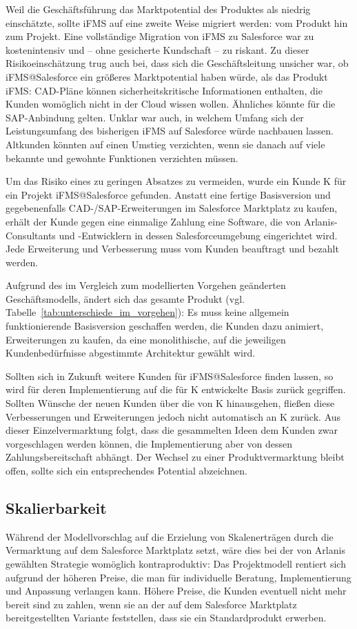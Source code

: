 Weil die Geschäftsführung das Marktpotential des Produktes als niedrig einschätzte, sollte
iFMS auf eine zweite Weise migriert werden: vom Produkt 
hin zum Projekt. Eine vollständige Migration von iFMS zu Salesforce war zu 
kostenintensiv und -- ohne gesicherte Kundschaft -- zu riskant. Zu dieser 
Risikoeinschätzung trug auch bei, dass sich die Geschäftsleitung unsicher war, 
ob iFMS@Salesforce ein größeres Marktpotential haben würde, als das Produkt iFMS: 
CAD-Pläne können sicherheitskritische 
Informationen enthalten, die Kunden womöglich nicht in der Cloud wissen wollen. 
Ähnliches könnte für die SAP-Anbindung gelten. Unklar war auch, in 
welchem Umfang sich der Leistungsumfang des bisherigen iFMS auf Salesforce 
würde nachbauen lassen. Altkunden könnten auf einen Umstieg verzichten, wenn 
sie danach auf viele bekannte und gewohnte Funktionen verzichten müssen. 

Um das Risiko eines zu geringen Absatzes zu vermeiden, wurde ein Kunde K für 
ein Projekt iFMS@Salesforce gefunden. Anstatt eine fertige Basisversion und 
gegebenenfalls CAD-/SAP-Erweiterungen im Salesforce Marktplatz zu kaufen, 
erhält der Kunde gegen eine einmalige Zahlung eine Software, die von 
Arlanis-Consultants und -Entwicklern in dessen Salesforceumgebung eingerichtet 
wird. 
Jede Erweiterung und Verbesserung muss vom Kunden beauftragt und bezahlt werden.



Aufgrund des im Vergleich zum modellierten Vorgehen geänderten 
Geschäftsmodells, ändert sich das gesamte Produkt (vgl. 
Tabelle~\ref{tab:unterschiede_im_vorgehen}): Es muss keine allgemein 
funktionierende Basisversion geschaffen werden, die Kunden dazu animiert, 
Erweiterungen zu kaufen, da eine monolithische, auf die jeweiligen 
Kundenbedürfnisse abgestimmte Architektur gewählt wird.

Sollten sich in Zukunft weitere Kunden für iFMS@Salesforce finden lassen, so 
wird für deren Implementierung auf die für K entwickelte Basis zurück 
gegriffen. Sollten Wünsche der neuen Kunden über die von K hinausgehen, fließen 
diese Verbesserungen und Erweiterungen jedoch nicht automatisch an K zurück. 
Aus dieser Einzelvermarktung folgt, dass die gesammelten Ideen dem Kunden zwar 
vorgeschlagen werden können, die Implementierung aber von dessen 
Zahlungsbereitschaft abhängt. Der Wechsel zu einer Produktvermarktung bleibt offen, sollte
sich ein entsprechendes Potential abzeichnen.

\subsection{Skalierbarkeit}
Während der Modellvorschlag auf die Erzielung von Skalenerträgen durch die 
Vermarktung auf dem Salesforce Marktplatz setzt, wäre dies bei der von Arlanis 
gewählten Strategie womöglich kontraproduktiv: Das Projektmodell rentiert sich 
aufgrund der höheren Preise, die man für individuelle Beratung, Implementierung 
und Anpassung verlangen kann. Höhere Preise, die Kunden eventuell nicht mehr 
bereit sind zu zahlen, wenn sie an der auf dem Salesforce Marktplatz 
bereitgestellten Variante feststellen, dass sie ein Standardprodukt erwerben.

